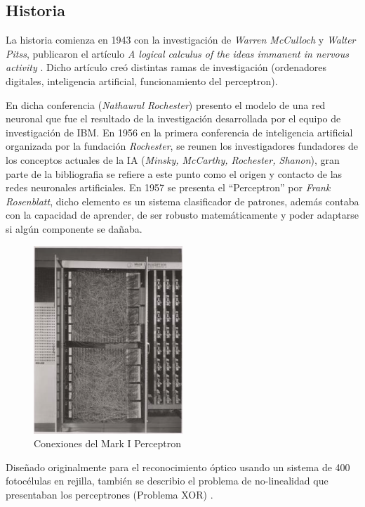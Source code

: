 \newpage
\subsection{Historia}
La historia comienza en 1943 con la investigación de \textit{Warren McCulloch} y \textit{Walter Pitss}, publicaron el artículo \textit{A logical calculus of the ideas immanent in nervous activity} \cite{mcculloch1943logical}.
Dicho artículo creó distintas ramas de investigación (ordenadores digitales, inteligencia artificial, funcionamiento del perceptron).

En dicha conferencia (\textit{Nathaural Rochester}) presento el modelo de una red neuronal que fue el resultado de la investigación desarrollada por el equipo de investigación de IBM.
En 1956 en la primera conferencia de inteligencia artificial organizada por la fundación \textit{Rochester}, se reunen los investigadores fundadores de los conceptos actuales de la IA (\textit{Minsky, McCarthy, Rochester, Shanon}), gran parte de la bibliografia se refiere a este punto como el origen y contacto de las redes neuronales artificiales.
En 1957 se presenta el ``Perceptron'' por \textit{Frank Rosenblatt}, dicho elemento es un sistema clasificador de patrones, además contaba con la capacidad de aprender, de ser robusto matemáticamente y poder adaptarse si algún componente se dañaba.
\begin{figure}[H]
    \centering
    \includegraphics[width=0.5\textwidth]{figures/perceptron.png}
    \caption{Conexiones del Mark I Perceptron}
    \label{fig:perceptron}
\end{figure}
Diseñado originalmente para el reconocimiento óptico usando un sistema de 400 fotocélulas en rejilla, también se describio el problema de no-linealidad que presentaban los perceptrones (Problema XOR) \cite{cuevastello2018apuntes}.


